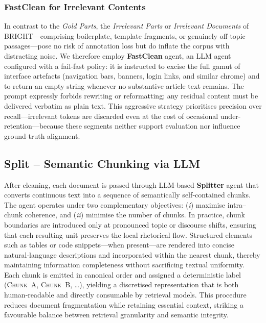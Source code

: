 \documentclass[11pt]{article}
\begin{document}
\subsubsection{FastClean for Irrelevant Contents}
In contrast to the \emph{Gold Parts}, the \emph{Irrelevant Parts} or \emph{Irrelevant Documents} of BRIGHT—comprising boilerplate, template fragments, or genuinely off-topic passages—pose no risk of annotation loss but do inflate the corpus with distracting noise.  
We therefore employ \textbf{FastClean} agent, an LLM agent configured with a fail-fast policy: it is instructed to excise the full gamut of interface artefacts (navigation bars, banners, login links, and similar chrome) and to return an empty string whenever no substantive article text remains.  
The prompt expressly forbids rewriting or reformatting; any residual content must be delivered verbatim as plain text.  
This aggressive strategy prioritises precision over recall—irrelevant tokens are discarded even at the cost of occasional under-retention—because these segments neither support evaluation nor influence ground-truth alignment.  


\subsection{Split -- Semantic Chunking via LLM}
After cleaning, each document is passed through LLM-based \textbf{Splitter} agent that converts continuous text into a sequence of semantically self‑contained chunks.  
The agent operates under two complementary objectives: (\emph{i}) maximise intra–chunk coherence, and (\emph{ii}) minimise the number of chunks.  
In practice, chunk boundaries are introduced only at pronounced topic or discourse shifts, ensuring that each resulting unit preserves the local rhetorical flow.  
Structured elements such as tables or code snippets—when present—are rendered into concise natural‑language descriptions and incorporated within the nearest chunk, thereby maintaining information completeness without sacrificing textual uniformity.  
Each chunk is emitted in canonical order and assigned a deterministic label (\textsc{Chunk~A}, \textsc{Chunk~B}, …), yielding a discretised representation that is both human‑readable and directly consumable by retrieval models.  
This procedure reduces document fragmentation while retaining essential context, striking a favourable balance between retrieval granularity and semantic integrity.
\end{document}
